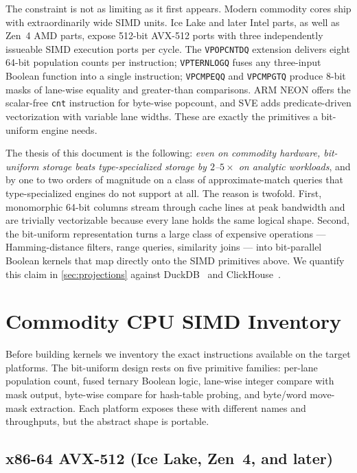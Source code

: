 \documentclass[10pt]{article}
\theoremstyle{definition}
\begin{document}
The constraint is not as limiting as it first appears. Modern commodity cores ship with extraordinarily wide SIMD units. Ice Lake and later Intel parts, as well as Zen~4 AMD parts, expose 512-bit AVX-512 ports with three independently issueable SIMD execution ports per cycle. The \texttt{VPOPCNTDQ} extension delivers eight 64-bit population counts per instruction; \texttt{VPTERNLOGQ} fuses any three-input Boolean function into a single instruction; \texttt{VPCMPEQQ} and \texttt{VPCMPGTQ} produce 8-bit masks of lane-wise equality and greater-than comparisons. ARM NEON offers the scalar-free \texttt{cnt} instruction for byte-wise popcount, and SVE adds predicate-driven vectorization with variable lane widths. These are exactly the primitives a bit-uniform engine needs.

The thesis of this document is the following: \emph{even on commodity hardware, bit-uniform storage beats type-specialized storage by $2$--$5\times$ on analytic workloads}, and by one to two orders of magnitude on a class of approximate-match queries that type-specialized engines do not support at all. The reason is twofold. First, monomorphic 64-bit columns stream through cache lines at peak bandwidth and are trivially vectorizable because every lane holds the same logical shape. Second, the bit-uniform representation turns a large class of expensive operations --- Hamming-distance filters, range queries, similarity joins --- into bit-parallel Boolean kernels that map directly onto the SIMD primitives above. We quantify this claim in \cref{sec:projections} against DuckDB~\citep{duckdb} and ClickHouse~\citep{clickhouse}.

\section{Commodity CPU SIMD Inventory}

Before building kernels we inventory the exact instructions available on the target platforms. The bit-uniform design rests on five primitive families: per-lane population count, fused ternary Boolean logic, lane-wise integer compare with mask output, byte-wise compare for hash-table probing, and byte/word move-mask extraction. Each platform exposes these with different names and throughputs, but the abstract shape is portable.

\subsection{x86-64 AVX-512 (Ice Lake, Zen~4, and later)}
\end{document}
